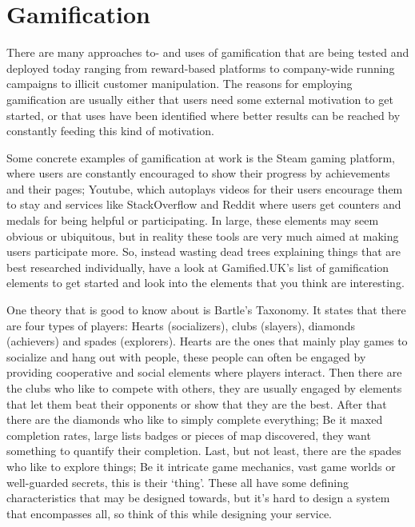 \section*{Gamification}
\begin{refsection}
There are many approaches to- and uses of gamification that are being tested and deployed today ranging from reward-based platforms to company-wide running campaigns to illicit customer manipulation. The reasons for employing gamification are usually either that users need some external motivation to get started, or that uses have been identified where better results can be reached by constantly feeding this kind of motivation.

    Some concrete examples of gamification at work is the Steam gaming platform, where users are constantly encouraged to show their progress by achievements and their pages; Youtube, which autoplays videos for their users encourage them to stay and services like StackOverflow and Reddit where users get counters and medals for being helpful or participating. In large, these elements may seem obvious or ubiquitous, but in reality these tools are very much aimed at making users participate more. So, instead wasting dead trees explaining things that are best researched individually, have a look at Gamified.UK's list of gamification\supercite{gamifieduk} elements to get started and look into the elements that you think are interesting.

    One theory that is good to know about is Bartle's Taxonomy\supercite{bartle}. It states that there are four types of players: Hearts (socializers), clubs (slayers), diamonds (achievers) and spades (explorers). Hearts are the ones that mainly play games to socialize and hang out with people, these people can often be engaged by providing cooperative and social elements where players interact. Then there are the clubs who like to compete with others, they are usually engaged by elements that let them beat their opponents or show that they are the best. After that there are the diamonds who like to simply complete everything; Be it maxed completion rates, large lists badges or pieces of map discovered, they want something to quantify their completion. Last, but not least, there are the spades who like to explore things; Be it intricate game mechanics, vast game worlds or well-guarded secrets, this is their `thing'. These all have some defining characteristics that may be designed towards, but it's hard to design a system that encompasses all, so think of this while designing your service.

\printbibliography[heading=subbibliography]

\end{refsection}

